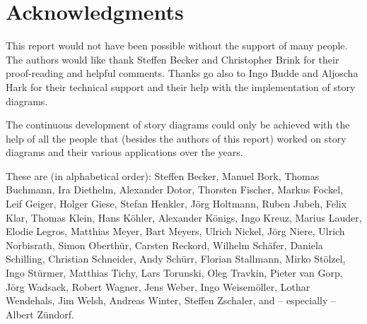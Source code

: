 \section*{Acknowledgments}

This report would not have been possible without the support of many people. The authors would like thank Steffen Becker and Christopher Brink for their proof-reading and helpful comments. Thanks go also to Ingo Budde and Aljoscha Hark for their technical support and their help with the implementation of story diagrams.

The continuous development of story diagrams could only be achieved with the help 
of all the people that (besides the authors of this report) worked on story diagrams and their various applications over the years.

These are (in alphabetical order): 
Steffen Becker, Manuel Bork, Thomas Buchmann, 
Ira Diethelm, Alexander Dotor, 
Thorsten Fischer, Markus Fockel,
Leif Geiger, Holger Giese, 
Stefan Henkler, J\"{o}rg Holtmann,
Ruben Jubeh,
Felix Klar, Thomas Klein, Hans K\"{o}hler, Alexander K\"{o}nigs, Ingo Kreuz, 
Marius Lauder, Elodie Legros,
Matthias Meyer, Bart Meyers, 
Ulrich Nickel, J\"{o}rg Niere, Ulrich Norbisrath,
Simon Oberth\"{u}r, 
Carsten Reckord, 
Wilhelm Sch\"{a}fer, Daniela Schilling, Christian Schneider, Andy Sch\"{u}rr, Florian Stallmann, Mirko St\"{o}lzel, Ingo St\"{u}rmer, 
Matthias Tichy, Lars Torunski, Oleg Travkin, 
Pieter van Gorp, 
J\"{o}rg Wadsack, Robert Wagner, Jens Weber, Ingo Weisem\"{o}ller, Lothar Wendehals, Jim Welsh, Andreas Winter, 
Steffen Zschaler, and -- especially -- Albert Z\"{u}ndorf.